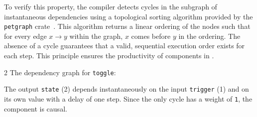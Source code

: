 \begin{enumerate}
          To verify this property, the compiler detects cycles in the subgraph of instantaneous
          dependencies using a topological sorting algorithm provided by the \texttt{petgraph}
          crate~\cite{petgraph_rust}. This algorithm returns a linear ordering of the nodes such
          that for every edge $x \rightarrow y$ within the graph, $x$ comes before $y$ in the
          ordering.
          The absence of a cycle guarantees that a valid, sequential execution order exists for each
          step. This principle ensures the productivity of components in .

          \begin{multicols}{2}
              The dependency graph for \texttt{toggle}:
              \begin{center}
              \end{center}
              \newcolumn
              The output \texttt{state} (2) depends instantaneously on the input \texttt{trigger}
              (1) and on its own value with a delay of one step. Since the only cycle has a weight
              of \texttt{1}, the component is causal.
          \end{multicols}


\end{enumerate}
